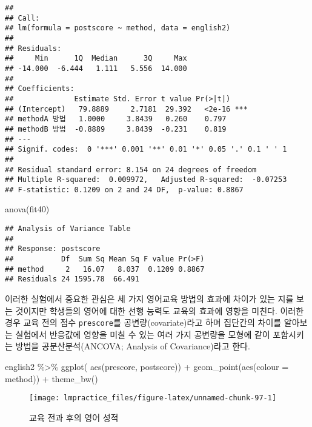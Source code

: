 \documentclass[
]{book}
\newenvironment{Shaded}{\begin{snugshade}}{\end{snugshade}}
\newcommand{\AttributeTok}[1]{\textcolor[rgb]{0.77,0.63,0.00}{#1}}
\newcommand{\FunctionTok}[1]{\textcolor[rgb]{0.00,0.00,0.00}{#1}}
\newcommand{\NormalTok}[1]{#1}
\newcommand{\SpecialCharTok}[1]{\textcolor[rgb]{0.00,0.00,0.00}{#1}}
\begin{document}
\begin{verbatim}
## 
## Call:
## lm(formula = postscore ~ method, data = english2)
## 
## Residuals:
##     Min      1Q  Median      3Q     Max 
## -14.000  -6.444   1.111   5.556  14.000 
## 
## Coefficients:
##              Estimate Std. Error t value Pr(>|t|)    
## (Intercept)   79.8889     2.7181  29.392   <2e-16 ***
## methodA 방법   1.0000     3.8439   0.260    0.797    
## methodB 방법  -0.8889     3.8439  -0.231    0.819    
## ---
## Signif. codes:  0 '***' 0.001 '**' 0.01 '*' 0.05 '.' 0.1 ' ' 1
## 
## Residual standard error: 8.154 on 24 degrees of freedom
## Multiple R-squared:  0.009972,   Adjusted R-squared:  -0.07253 
## F-statistic: 0.1209 on 2 and 24 DF,  p-value: 0.8867
\end{verbatim}

\begin{Shaded}
\begin{Highlighting}[]
\FunctionTok{anova}\NormalTok{(fit40)}
\end{Highlighting}
\end{Shaded}

\begin{verbatim}
## Analysis of Variance Table
## 
## Response: postscore
##           Df  Sum Sq Mean Sq F value Pr(>F)
## method     2   16.07   8.037  0.1209 0.8867
## Residuals 24 1595.78  66.491
\end{verbatim}

이러한 실험에서 중요한 관심은 세 가지 영어교육 방법의 효과에 차이가 있는 지를 보는 것이지만 학생들의 영어에 대한 선행 능력도 교육의 효과에 영향을 미친다. 이러한 경우
교육 전의 점수 \texttt{prescore}를 공변량(covariate)라고 하며 집단간의 차이를 알아보는 실험에서 반응값에 영향을 미칠 수 있는 여러 가지 공변량을 모형에 같이 포함시키는 방법을 공분산분석(ANCOVA; Analysis of Covariance)라고 한다.

\begin{Shaded}
\begin{Highlighting}[]
\NormalTok{english2 }\SpecialCharTok{\%\textgreater{}\%} \FunctionTok{ggplot}\NormalTok{( }\FunctionTok{aes}\NormalTok{(prescore, postscore)) }\SpecialCharTok{+} \FunctionTok{geom\_point}\NormalTok{(}\FunctionTok{aes}\NormalTok{(}\AttributeTok{colour =}\NormalTok{ method)) }\SpecialCharTok{+} \FunctionTok{theme\_bw}\NormalTok{()}
\end{Highlighting}
\end{Shaded}

\begin{figure}

{\centering \texttt{[image: lmpractice\_files/figure-latex/unnamed-chunk-97-1]} 

}

\caption{교육 전과 후의 영어 성적}\label{fig:unnamed-chunk-97}
\end{figure}
\end{document}
